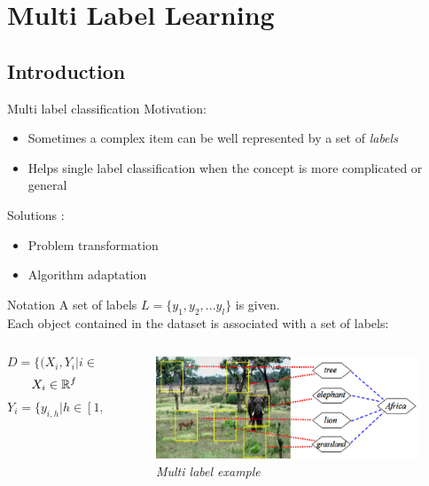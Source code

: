  \section{Multi Label Learning}
 
\subsection*{Introduction}
\begin{frame}{Multi label classification}
	Motivation:
	\begin{itemize}\setlength\itemsep{1em}
		\item Sometimes a complex item can be well represented by a set of \textit{labels}
		\item Helps single label classification when the concept is more complicated or general
	\end{itemize}
	Solutions \cite{ml_approaches}:
	\begin{itemize}\setlength\itemsep{1em}
		\item Problem transformation
		\item Algorithm adaptation
	\end{itemize}
\end{frame}

\begin{frame}{Notation}
	A set of labels $L = \{y_1, y_2,... y_l\}$ is given.\\
	Each object contained in the dataset is associated with a set of labels:
	\begin{columns}
		\begin{column}{0.5\textwidth}\centering
		$$D = \{(X_i, Y_i | i \in [1, n]\}$$
		$$X_i \in \mathbb{R}^f$$
		$$Y_i = \{y_{i,h} | h \in [1, h_i], y_{i,h} \in L, h_i \leq l\}$$
		\end{column}
		\begin{column}{0.5\textwidth}\centering
		\begin{figure}[htbp]
			\centering
			\includegraphics[scale = 0.3]{./images/ml1.png}
			\caption{\textit{Multi label example}}
		\end{figure}
		\end{column}
	\end{columns}
	
\end{frame}

